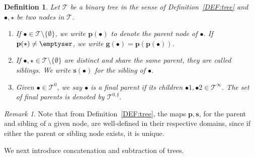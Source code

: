 \documentclass[a4paper,
11pt,  reqno]{amsart}
\newcommand{\5}{\textup{V}}
\newtheorem{definition}[theorem]{Definition}
\theoremstyle{remark}
\newtheorem{remark}[theorem]{Remark}
\newcommand{\bul}{\bullet}
\newcommand{\TT}{\mathcal{T}}
\newcommand{\pb}{\mathbf{p}}
\newcommand{\gb}{\mathbf{g}}
\newcommand{\sbf}{\mathbf{s}}
\newcommand{\ff}{\mathfrak{f}}
\numberwithin{equation}{section}
\numberwithin{theorem}{section}
\begin{document}
\begin{definition}\rm
\label{DEF:tree2}
Let $\TT$ be a binary tree in the sense of Definition~\ref{DEF:tree} and 
$\bul, \star$ be two nodes in $\TT$. 

\begin{enumerate}



\smallskip
\item[(i)]
If $\bul \in \TT\setminus \{ \emptyset\}$, we write $\pb(\bul)$ to denote the \emph{parent node} of $\bul$. If $\pb(\star)\neq \emptyser$, we write $\gb(\bul)=\pb(\pb(\bul))$.

\smallskip
\item[(ii)] 
If $\bul, \star\in \TT \setminus\{ \emptyset \}$ are distinct and share the same parent, they are called \textit{siblings}. We write $\sbf(\bul)$ for the sibling of $\bul$. 

\smallskip
\item[(iii)] 
Given $\bul\in \TT^0$, we say $\bul$ is a \textit{final parent} if its children $\bul1, \bul2 \in \TT^\infty$. The set of final parents is denoted by $\TT^{0,\ff}$.


\end{enumerate}



\end{definition}


\begin{remark}\rm 
Note that from Definition~\ref{DEF:tree}, the maps $\pb, \sbf$, for the parent and sibling of a given node, are well-defined in their respective domains, since if either the parent or sibling node exists, it is unique. 

\end{remark}





We next introduce concatenation and subtraction of trees. 
\end{document}
